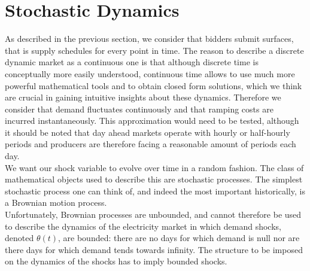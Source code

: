 \section{Stochastic Dynamics}\label{math}

As described in the previous section, we consider that bidders submit surfaces, that is supply schedules for every point in time. The reason to describe a discrete dynamic market as a continuous one is that although discrete time is conceptually more easily understood, continuous time allows to use much more powerful mathematical tools and to obtain closed form solutions, which we think are crucial in gaining intuitive insights about these dynamics. Therefore we consider that demand fluctuates continuously and that ramping costs are incurred instantaneously. This approximation would need to be tested, although it should be noted that day ahead markets operate with hourly or half-hourly periods and producers are therefore facing a reasonable amount of periods each day. \\ 

We want our shock variable to evolve over time in a random fashion. The class of mathematical objects used to describe this are stochastic processes. The simplest stochastic process one can think of, and indeed the most important historically, is a Brownian motion process. \\

Unfortunately, Brownian processes are unbounded, and cannot therefore be used to describe the dynamics of the electricity market in which demand shocks, denoted $\theta(t)$, are bounded: there are no days for which demand is null nor are there days for which demand tends towards infinity. The structure to be imposed on the dynamics of the shocks has to imply bounded shocks.\\

%

